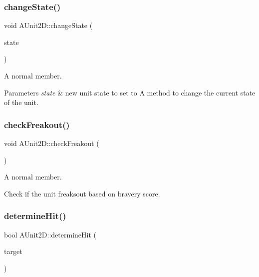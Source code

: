 \subsubsection{\texorpdfstring{change\+State()}{changeState()}}
{\footnotesize\ttfamily void A\+Unit2\+D\+::change\+State (\begin{DoxyParamCaption}\item[{E\+Unit\+State}]{state }\end{DoxyParamCaption})}



A normal member. 


\begin{DoxyParams}{Parameters}
{\em state} & new unit state to set to A method to change the current state of the unit. \\
\hline
\end{DoxyParams}
\hypertarget{class_a_unit2_d_ae1d7c09760d899ca25e96a9573b2ddf0}{}\label{class_a_unit2_d_ae1d7c09760d899ca25e96a9573b2ddf0} 
\subsubsection{\texorpdfstring{check\+Freakout()}{checkFreakout()}}
{\footnotesize\ttfamily void A\+Unit2\+D\+::check\+Freakout (\begin{DoxyParamCaption}{ }\end{DoxyParamCaption})}



A normal member. 

Check if the unit freaksout based on bravery score. \hypertarget{class_a_unit2_d_aec8aadc1698c1a0e26d76ce97b2515d0}{}\label{class_a_unit2_d_aec8aadc1698c1a0e26d76ce97b2515d0} 
\subsubsection{\texorpdfstring{determine\+Hit()}{determineHit()}}
{\footnotesize\ttfamily bool A\+Unit2\+D\+::determine\+Hit (\begin{DoxyParamCaption}\item[{\hyperlink{class_a_unit2_d}{A\+Unit2D} $\ast$}]{target }\end{DoxyParamCaption})}



